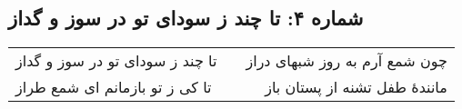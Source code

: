 \begin{center}
\section*{شماره ۴: تا چند ز سودای تو در سوز و گداز}
\label{sec:004}
\begin{longtable}{l p{0.5cm} r}
تا چند ز سودای تو در سوز و گداز
&&
چون شمع آرم به روز شبهای دراز
\\
تا کی ز تو بازمانم ای شمع طراز
&&
مانندهٔ طفل تشنه از پستان باز
\\
\end{longtable}
\end{center}
